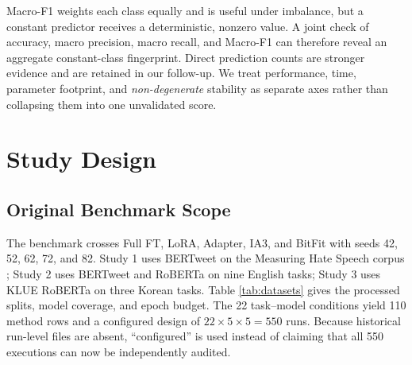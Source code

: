 \documentclass{SPC}
\begin{document}
Macro-F1 weights each class equally and is useful under imbalance, but a constant predictor receives a deterministic, nonzero value. A joint check of accuracy, macro precision, macro recall, and Macro-F1 can therefore reveal an aggregate constant-class fingerprint. Direct prediction counts are stronger evidence and are retained in our follow-up. We treat performance, time, parameter footprint, and \emph{non-degenerate} stability as separate axes rather than collapsing them into one unvalidated score.


\section{Study Design}

\subsection{Original Benchmark Scope}

The benchmark crosses Full FT, LoRA, Adapter, IA3, and BitFit with seeds 42, 52, 62, 72, and 82. Study 1 uses BERTweet on the Measuring Hate Speech corpus \cite{22,27}; Study 2 uses BERTweet and RoBERTa on nine English tasks; Study 3 uses KLUE RoBERTa on three Korean tasks. Table \ref{tab:datasets} gives the processed splits, model coverage, and epoch budget. The 22 task--model conditions yield 110 method rows and a configured design of $22\times5\times5=550$ runs. Because historical run-level files are absent, ``configured'' is used instead of claiming that all 550 executions can now be independently audited.
\end{document}
